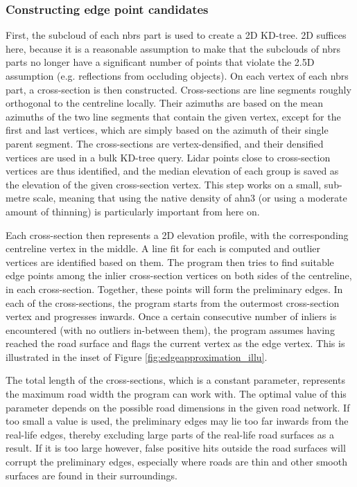 \subsubsection{Constructing edge point candidates}

First, the subcloud of each \ac{nbrs} part is used to create a 2D KD-tree. 2D suffices here, because it is a reasonable assumption to make that the subclouds of \ac{nbrs} parts no longer have a significant number of points that violate the 2.5D assumption (e.g. reflections from occluding objects). On each vertex of each \ac{nbrs} part, a cross-section is then constructed. Cross-sections are line segments roughly orthogonal to the centreline locally. Their azimuths are based on the mean azimuths of the two line segments that contain the given vertex, except for the first and last vertices, which are simply based on the azimuth of their single parent segment. The cross-sections are vertex-densified, and their densified vertices are used in a bulk KD-tree query. Lidar points close to cross-section vertices are thus identified, and the median elevation of each group is saved as the elevation of the given cross-section vertex. This step works on a small, sub-metre scale, meaning that using the native density of \ac{ahn3} (or using a moderate amount of thinning) is particularly important from here on.

Each cross-section then represents a 2D elevation profile, with the corresponding centreline vertex in the middle. A line fit for each is computed and outlier vertices are identified based on them. The program then tries to find suitable edge points among the inlier cross-section vertices on both sides of the centreline, in each cross-section. Together, these points will form the preliminary edges. In each of the cross-sections, the program starts from the outermost cross-section vertex and progresses inwards. Once a certain consecutive number of inliers is encountered (with no outliers in-between them), the program assumes having reached the road surface and flags the current vertex as the edge vertex. This is illustrated in the inset of Figure \ref{fig:edgeapproximation_illu}.

The total length of the cross-sections, which is a constant parameter, represents the maximum road width the program can work with. The optimal value of this parameter depends on the possible road dimensions in the given road network. If too small a value is used, the preliminary edges may lie too far inwards from the real-life edges, thereby excluding large parts of the real-life road surfaces as a result. If it is too large however, false positive hits outside the road surfaces will corrupt the preliminary edges, especially where roads are thin and other smooth surfaces are found in their surroundings.

